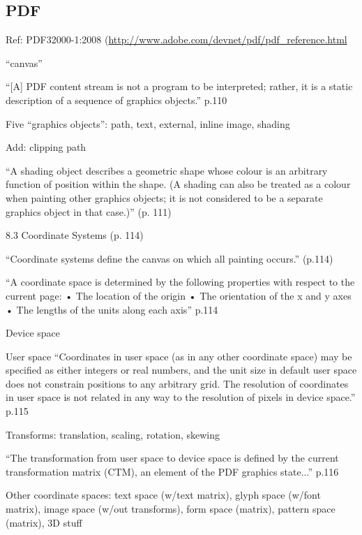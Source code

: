 \documentclass[12pt]{tufte-handout}
\numberwithin{equation}{subsection}
\numberwithin{equation}{subsection}
\begin{document}
\begin{appendices}
                \subsection{PDF}

                Ref:  PDF32000-1:2008 (\url{http://www.adobe.com/devnet/pdf/pdf\_reference.html}

                ``canvas''

                ``[A] PDF content stream is not a program to be interpreted; rather, it is a static description of a sequence of graphics objects.'' p.110

                Five ``graphics objects'': path, text, external, inline image, shading

                Add: clipping path

                ``A shading object describes a geometric shape whose colour is an arbitrary function of position within the shape. (A shading can also be treated as a colour when painting other graphics objects; it is not considered to be a separate graphics object in that case.)'' (p. 111)


                8.3 Coordinate Systems (p. 114)

                ``Coordinate systems define the canvas on which all painting occurs.'' (p.114)

                ``A coordinate space is determined by the following properties with respect to the current page:
                • The location of the origin
                • The orientation of the x and y axes
                • The lengths of the units along each axis'' p.114

                Device space

                User space
                ``Coordinates in user space (as in any other coordinate space) may be specified as either integers or real numbers, and the unit size in default user space does not constrain positions to any arbitrary grid. The resolution of coordinates in user space is not related in any way to the resolution of pixels in device space.'' p.115

                Transforms: translation, scaling, rotation, skewing


                ``The transformation from user space to device space is defined by the current transformation matrix (CTM), an element of the PDF graphics state...'' p.116

                Other coordinate spaces: text space (w/text matrix), glyph space
                (w/font matrix), image space (w/out transforms), form space (matrix),
                pattern space (matrix), 3D stuff


\end{appendices}
\end{document}
